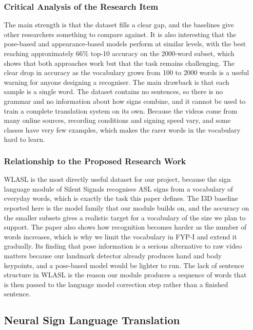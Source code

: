 \documentclass{FastFyp}
\begin{document}
\subsubsection*{Critical Analysis of the Research Item}
The main strength is that the dataset fills a clear gap, and the baselines give other researchers something to compare against. It is also interesting that the pose-based and appearance-based models perform at similar levels, with the best reaching approximately 66\% top-10 accuracy on the 2000-word subset, which shows that both approaches work but that the task remains challenging. The clear drop in accuracy as the vocabulary grows from 100 to 2000 words is a useful warning for anyone designing a recogniser. The main drawback is that each sample is a single word. The dataset contains no sentences, so there is no grammar and no information about how signs combine, and it cannot be used to train a complete translation system on its own. Because the videos come from many online sources, recording conditions and signing speed vary, and some classes have very few examples, which makes the rarer words in the vocabulary hard to learn.

\subsubsection*{Relationship to the Proposed Research Work}
WLASL is the most directly useful dataset for our project, because the sign language module of Silent Signals recognises ASL signs from a vocabulary of everyday words, which is exactly the task this paper defines. The I3D baseline reported here is the model family that our module builds on, and the accuracy on the smaller subsets gives a realistic target for a vocabulary of the size we plan to support. The paper also shows how recognition becomes harder as the number of words increases, which is why we limit the vocabulary in FYP-I and extend it gradually. Its finding that pose information is a serious alternative to raw video matters because our landmark detector already produces hand and body keypoints, and a pose-based model would be lighter to run. The lack of sentence structure in WLASL is the reason our module produces a sequence of words that is then passed to the language model correction step rather than a finished sentence.

\subsection{Neural Sign Language Translation}
\end{document}
